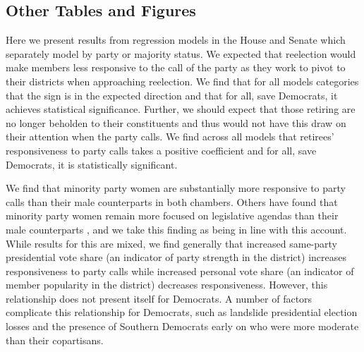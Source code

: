 \documentclass[12pt]{article}
\begin{document}
\subsection*{Other Tables and Figures}

Here we present results from regression models in the House and Senate which separately model by party or majority status. We expected that reelection would make members less responsive to the call of the party as they work to pivot to their districts when approaching reelection. We find that for all models categories that the sign is in the expected direction and that for all, save Democrats, it achieves statistical significance. Further, we should expect that those retiring are no longer beholden to their constituents and thus would not have this draw on their attention when the party calls. We find across all models that retirees' responsiveness to party calls takes a positive coefficient and for all, save Democrats, it is statistically significant. 

We find that minority party women are substantially more responsive to party calls than their male counterparts in both chambers. Others have found that minority party women remain more focused on legislative agendas than their male counterparts \cite{Volden:2013}, and we take this finding as being in line with this account. While results for this are mixed, we find generally that increased same-party presidential vote share (an indicator of party strength in the district) increases responsiveness to party calls while increased personal vote share (an indicator of member popularity in the district) decreases responsiveness. However, this relationship does not present itself for Democrats. A number of factors complicate this relationship for Democrats, such as landslide presidential election losses and the presence of Southern Democrats early on who were more moderate than their copartisans.
\end{document}
